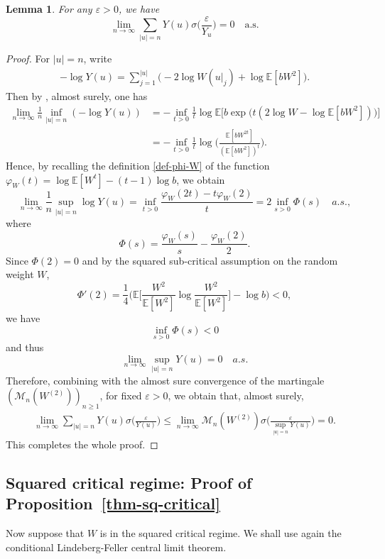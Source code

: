 \documentclass[12pt]{amsart}
\newtheorem{lemma}[theorem]{Lemma}
\theoremstyle{definition}
\theoremstyle{remark}
\newcommand{\E}{\mathbb{E}}
\newcommand{\MAB}{\mathscr{M}_{n}(W^{(2)})}
\newcommand{\VU}{Y(u)}
\numberwithin{equation}{section}
\begin{document}
\begin{lemma}\label{lemma-Yu-zero-s}
 For any $\varepsilon>0$,  we have 
\[
\lim_{n\rightarrow \infty} \sum_{|u|=n} \VU\sigma\Big(\frac{\varepsilon}{Y_u}\Big)=0 \quad \text{a.s}.
\]
\end{lemma}
\begin{proof}
For $|u|=n$, write 
\begin{align}\label{def-Vu}
 - \log \VU=   \sum_{j=1}^{|u|}    \big( -2 \log W(u|_j) + \log \E[bW^2]\big). 
\end{align}
Then by \cite[Theorem~1.3]{shi-zhan-book}, almost surely, one has
\begin{align*}
\lim_{n\to\infty} \frac{1}{n} \inf_{|u|=n}  ( - \log \VU) & =   - \inf_{t>0} \frac{1}{t} \log \E \Big[ b \exp \Big(t (2 \log W - \log \E[bW^2])    \Big) \Big]  
\\
 & =  - \inf_{t>0}   \frac{1}{t} \log   \Big( \frac{\E[b W^{2t}]}{(\E[bW^2])^t}  \Big). 
\end{align*}
Hence, by recalling  the definition \eqref{def-phi-W} of the function 
$
\varphi_W(t)= \log \E[W^t] - (t-1) \log b
$,  we obtain 
\[
\lim_{n\to\infty}  \frac{1}{n} \sup_{|u|=n}   \log \VU  =  \inf_{t>0}   \frac{ \varphi_W(2t) -     t \varphi_W(2) }{t}  = 2   \inf_{s>0}  \Phi(s)   \quad a.s. ,
\]
where \[
\Phi(s)  = \frac{\varphi_W(s)}{s}- \frac{\varphi_W(2)}{2}.
\]
 Since $\Phi(2)= 0$ and  by the squared sub-critical assumption on the random weight $W$, 
\[
\Phi'(2)=   \frac{1}{4} \Big(   \E\Big[ \frac{W^2}{\E[W^2]} \log \frac{W^2}{\E[W^2]}\Big] -  \log b\Big) < 0,
\]
we have  
\[
\inf_{s>0}  \Phi(s)<0
\] 
and thus 
\[
\lim_{n\rightarrow \infty} \sup_{|u|=n} \VU=0 \quad a.s. 
\]
Therefore, combining with the almost sure convergence of the martingale  $(\MAB)_{n\ge 1}$,  for fixed $\varepsilon>0$,  we obtain that, almost surely,
\begin{align*}
\lim_{n\rightarrow \infty} \sum_{|u|=n} \VU\sigma\Big(\frac{\varepsilon}{\VU}\Big) 
\le \lim_{n\rightarrow \infty}\MAB\sigma\Big(\frac{\varepsilon}{\sup_{|u|=n}\VU}\Big) = 0.
\end{align*}
This completes the whole proof.
\end{proof}



\subsection{Squared critical regime: Proof of Proposition~\ref{thm-sq-critical}}
Now suppose that $W$ is in the squared critical regime.  We shall  use  again the conditional   Lindeberg-Feller central limit theorem.
\end{document}
